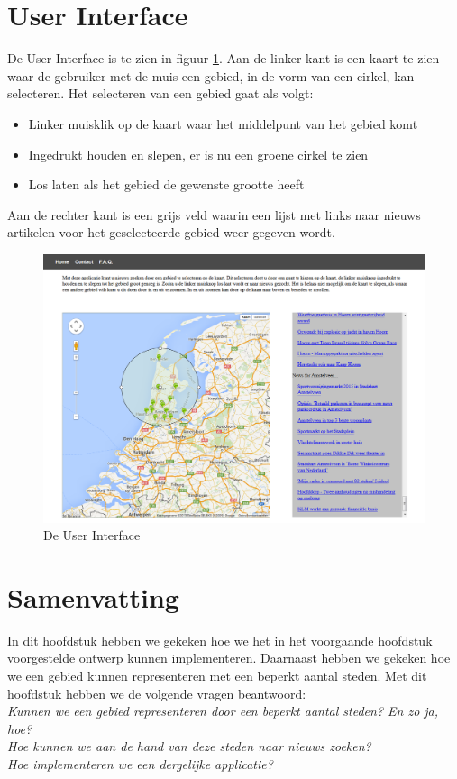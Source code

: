 \documentclass[twoside,openright]{uva-bachelor-thesis}
\begin{document}
		\section{User Interface}
		De User Interface is te zien in figuur \ref{fig:UI}. Aan de linker kant is een kaart te zien waar de gebruiker met de muis een gebied, in de vorm van een cirkel, kan selecteren. Het selecteren van een gebied gaat als volgt:
		\begin{itemize}
			\item Linker muisklik op de kaart waar het middelpunt van het gebied komt
			\item{Ingedrukt houden en slepen, er is nu een groene cirkel te zien}
			\item{Los laten als het gebied de gewenste grootte heeft}
		\end{itemize}
		Aan de rechter kant is een grijs veld waarin een lijst met links naar nieuws artikelen voor het geselecteerde gebied weer gegeven wordt.
		\begin{figure}[!htb]
			\centering
			\includegraphics[angle=-90,origin=c,scale=0.70]{./img/UI.png}
			\caption{De User Interface}
			\label{fig:UI}
		\end{figure}
	\section{Samenvatting}
		In dit hoofdstuk hebben we gekeken hoe we het in het voorgaande hoofdstuk voorgestelde ontwerp kunnen implementeren. Daarnaast hebben we gekeken hoe we een gebied kunnen representeren met een beperkt aantal steden. Met dit hoofdstuk hebben we de volgende vragen beantwoord:\\[0.5cm]
		\indent \textit{Kunnen we een gebied representeren door een beperkt aantal steden? En zo ja, hoe?} \\[0.2cm]
		\indent \textit{Hoe kunnen we aan de hand van deze steden naar nieuws zoeken?}\\[0.2cm]
		\indent \textit{Hoe implementeren we een dergelijke applicatie?}\\[0.5cm]
\end{document}
